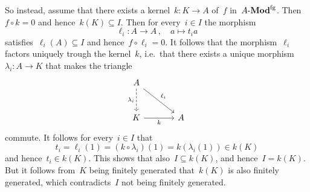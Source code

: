 \begin{example}
\begin{enumerate}
      So instead, assume that there exists a kernel~$k \colon K \to A$ of~$f$ in~$\text{$A$-$\mathbf{Mod}^{\mathrm{fg}}$}$.
      Then~$f \circ k = 0$ and hence~$k(K) \subseteq I$.
      Then for every~$i \in I$ the morphism
      \[
                \ell_i
        \colon  A
        \to     A \,,
        \quad   a
        \mapsto t_i a
      \]
      satisfies~$\ell_i(A) \subseteq I$ and hence~$f \circ \ell_i = 0$.
      It follows that the morphism~$\ell_i$ factors uniquely trough the kernel~$k$, i.e.\ that there exists a unique morphism~$\lambda_i \colon A \to K$ that makes the triangle
      \[
        \begin{tikzcd}[sep = large]
            A
            \arrow[dashed]{d}[left]{\lambda_i}
            \arrow{dr}[above right]{\ell_i}
          & {}
          \\
            K
            \arrow{r}[below]{k}
          & A
        \end{tikzcd}
      \]
      commute.
      It follows for every~$i \in I$ that
      \[
            t_i
        =   \ell_i(1)
        =   (k \circ \lambda_i)(1)
        =   k(\lambda_i(1))
        \in k(K)
      \]
      and hence~$t_i \in k(K)$.
      This shows that also~$I \subseteq k(K)$, and hence~$I = k(K)$.
      But it follows from~$K$ being finitely generated that~$k(K)$ is also finitely generated, which contradicts~$I$ not being finitely generated.
  \end{enumerate}
\end{example}




